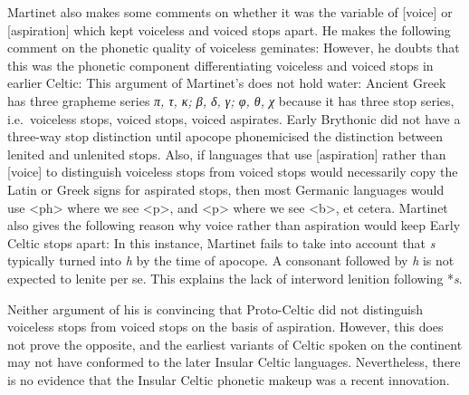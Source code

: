 Martinet also makes some comments on whether it was the variable of [voice] or [aspiration] which kept voiceless and voiced stops apart. He makes the following comment on the phonetic quality of voiceless geminates:
However, he doubts that this was the phonetic component differentiating voiceless and voiced stops in earlier Celtic:
This argument of Martinet's does not hold water: Ancient Greek has three grapheme series \textit{π, τ, κ;  β, δ, γ; φ, θ, χ} because it has three stop series, i.e.\ voiceless stops, voiced stops, voiced aspirates. Early Brythonic did not have a three-way stop distinction until apocope phonemicised the distinction between lenited and unlenited stops. Also, if languages that use [aspiration] rather than [voice] to distinguish voiceless stops from voiced stops would necessarily copy the Latin or Greek signs for aspirated stops, then most Germanic languages would use <ph> where we see <p>, and <p> where we see <b>, et cetera.
Martinet also gives the following reason why voice rather than aspiration would keep Early Celtic stops apart:
In this instance, Martinet fails to take into account that \textit{s} typically turned into \textit{h} by the time of apocope. A consonant followed by \textit{h} is not expected to lenite per se. This explains the lack of interword lenition following *\textit{s}.

Neither argument of his is convincing that Proto-Celtic did not distinguish voiceless stops from voiced stops on the basis of aspiration. However, this does not prove the opposite, and  the earliest variants of Celtic spoken on the continent may not have conformed to the later Insular Celtic languages. Nevertheless, there is no evidence that the Insular Celtic phonetic makeup was a recent innovation.


